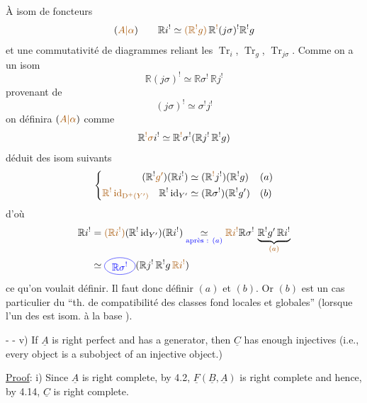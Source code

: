 À  isom de foncteurs
\[
(\unsure{A|\alpha})\qquad \mathbb{R}i^!\simeq
\deleted{\unsure{(\mathbb{R}^!g)}}\,\mathbb{R}^{\deleted{\unsure{!}}}(j\sigma)^!\mathbb{R}^!g
\]
et une commutativité de diagrammes reliant les $\operatorname{Tr}_i$, $\operatorname{Tr}_g$, $\operatorname{Tr}_{j\sigma}$.
Comme on a un isom
\[
\mathbb{R}(j\sigma)^!\simeq \mathbb{R}\sigma^!\,\mathbb{R}j^!
\]
provenant de
\[
(j\sigma)^!\simeq\sigma^!j^!
\]
on définira $(\unsure{A|\alpha})$ comme 
\[
\mathbb{R}^{\deleted{\unsure{!}}}\deleted{\unsure{\sigma}}i^!
\simeq \mathbb{R}^{\deleted{\unsure{!}}}\sigma^!(\mathbb{R}j^!\,\mathbb{R}^!g)
\]
déduit des isom suivants
\[
\left\{\begin{aligned}
(\mathbb{R}^!\unsure{g'})(\mathbb{R}i^!)&\simeq(\mathbb{R}^{\deleted{\unsure{!}}}j^!)(\mathbb{R}^!g) &&(a)\\
\deleted{\unsure{\mathbb{R}^!\operatorname{id}_{\mathrm D^+(Y')}}}\quad
\mathbb{R}^!\operatorname{id}_{Y'}&\simeq(\mathbb{R}\sigma^!)(\mathbb{R}^!g') &&(b)
\end{aligned}\right.
\]
d'où
\[
\begin{aligned}
\mathbb{R}i^!&=\deleted{\unsure{(\mathbb{R}i^!)}}
(\mathbb{R}^!\operatorname{id}_{Y'})(\mathbb{R}i^!)
\underset{\inserted{\text{après : $(a)$}}}{\simeq}
\deleted{\unsure{\mathbb{R}i^!}}\mathbb{R}\sigma^!\,
\underbrace{\mathbb{R}^!g'\,\mathbb{R}i^!}_{\deleted{\unsure{(a)}}}\\
&\simeq
\inserted{\text{\figure{\begin{tikzpicture}[baseline=-.5ex]
\draw (0,0) ellipse (.55 and .3);
\node at (0,0) {$\mathbb{R}\sigma^!$};
\end{tikzpicture}}}}
(\mathbb{R}j^!\,\mathbb{R}^!g\,\deleted{\unsure{\mathbb{R}i^!}})
\end{aligned}
\]
ce qu'on voulait définir. Il faut donc définir $(a)$ et $(b)$. Or $(b)$ est un cas particulier du ``th. de compatibilité des classes fond locales et globales'' (lorsque l'un des   est isom. à la base \unsure{\ldots}).

-  -
v) If $\underline A$ is right perfect and has a generator, then $\underline C$ has enough injectives (i.e., every object is a subobject of an injective object.)

\uline{Proof}: i) Since $\underline A$ is right complete, by 4.2, $\underline F(\underline B,\underline A)$ is right complete and hence, by 4.14, $\underline C$ is right complete.

